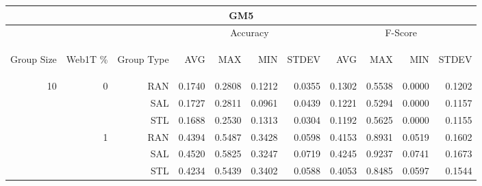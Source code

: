 \begin{center}
\begin{table}[htbp]
\begin{tabular}{ | r | r | r | r | r | r | r | r | r | r | r |}
\hline
\multicolumn{11}{|c|}{GM5}\\
\hline
 & & & \multicolumn{4}{|c|}{Accuracy} & \multicolumn{4}{|c|}{F-Score}\\ \cline{4-11}
\begin{sideways}Group Size\end{sideways} & \begin{sideways}Web1T \%\end{sideways} & \begin{sideways}Group Type\end{sideways} & \begin{sideways}AVG\end{sideways} & \begin{sideways}MAX\end{sideways} & \begin{sideways}MIN\end{sideways} & \begin{sideways}STDEV\end{sideways} & \begin{sideways}AVG\end{sideways} & \begin{sideways}MAX\end{sideways} & \begin{sideways}MIN\end{sideways} & \begin{sideways}STDEV\end{sideways}\\
\hline
\multirow{18}{*}{10}
 & \multirow{3}{*}{0} & RAN & 0.1740 & 0.2808 & 0.1212 & 0.0355 & 0.1302 & 0.5538 & 0.0000 & 0.1202\\ \cline{3-11}
 &   & SAL & 0.1727 & 0.2811 & 0.0961 & 0.0439 & 0.1221 & 0.5294 & 0.0000 & 0.1157\\ \cline{3-11}
 &   & STL & 0.1688 & 0.2530 & 0.1313 & 0.0304 & 0.1192 & 0.5625 & 0.0000 & 0.1155\\ \cline{2-11}
 & \multirow{3}{*}{1} & RAN & 0.4394 & 0.5487 & 0.3428 & 0.0598 & 0.4153 & 0.8931 & 0.0519 & 0.1602\\ \cline{3-11}
 &   & SAL & 0.4520 & 0.5825 & 0.3247 & 0.0719 & 0.4245 & 0.9237 & 0.0741 & 0.1673\\ \cline{3-11}
 &   & STL & 0.4234 & 0.5439 & 0.3402 & 0.0588 & 0.4053 & 0.8485 & 0.0597 & 0.1544\\ \cline{2-11}

\end{tabular}
\end{table}
\end{center}
